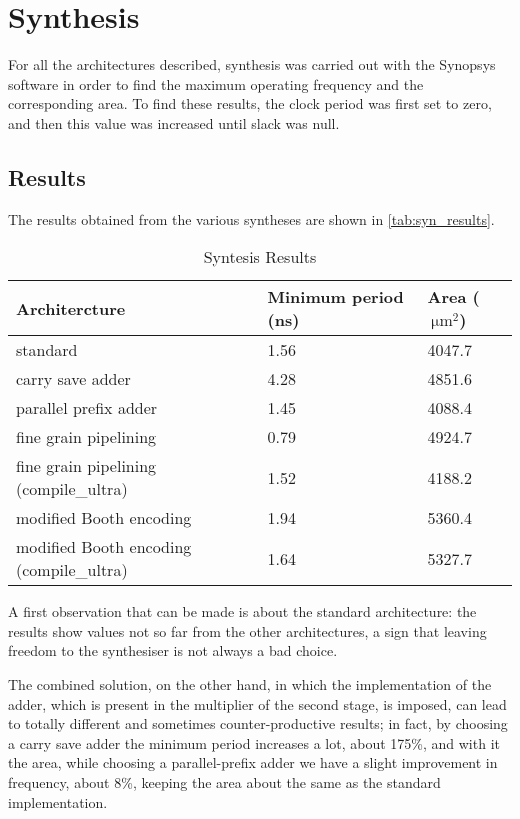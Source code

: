 \section{Synthesis}
For all the architectures described, synthesis was carried out with the Synopsys software in order to find the maximum operating frequency and the corresponding area. To find these results, the clock period was first set to zero, and then this value was increased until slack was null.

\subsection{Results}

The results obtained from the various syntheses are shown in \autoref{tab:syn_results}.

\begin{table}[h]
\begin{center}
\begin{tabular}{|l|l|l|}
\hline
Architercture & Minimum period (ns) & Area ($\SI{}{\micro\meter}^2$)\\
\hline
standard & 1.56 & 4047.7\\
\hline
carry save adder & 4.28 & 4851.6\\
\hline
parallel prefix adder & 1.45 & 4088.4\\
\hline
fine grain pipelining & 0.79 & 4924.7\\
\hline
fine grain pipelining (compile\_ultra) & 1.52 & 4188.2\\
\hline
modified Booth encoding & 1.94 & 5360.4\\
\hline
modified Booth encoding (compile\_ultra) & 1.64 & 5327.7\\
\hline
\end{tabular}
\end{center}
\caption{Syntesis Results}
\label{tab:syn_results}
\end{table}

A first observation that can be made is about the standard architecture: the results show values not so far from the other architectures, a sign that leaving freedom to the synthesiser is not always a bad choice.

The combined solution, on the other hand, in which the implementation of the adder, which is present in the multiplier of the second stage, is imposed, can lead to totally different and sometimes counter-productive results; in fact, by choosing a carry save adder the minimum period increases a lot, about 175\%, and with it the area, while choosing a parallel-prefix adder we have a slight improvement in frequency, about 8\%, keeping the area about the same as the standard implementation.

